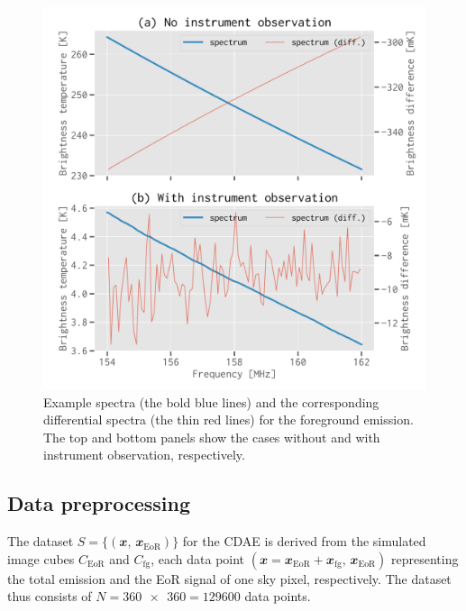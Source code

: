 \documentclass[letters,fleqn,usenatbib]{mnras}
\newlength{\myfigwidth}
\newcommand{\R}[1]{\mathrm{#1}}
\newcommand{\B}[1]{\mathbfit{#1}}
\begin{document}
\begin{figure}
  \centering
  \includegraphics[width=\myfigwidth]{simudata}
  \caption{\label{fig:simudata}%
    Example spectra (the bold blue lines) and the corresponding
    differential spectra (the thin red lines) for the foreground
    emission.
    The top and bottom panels show the cases without and with
    instrument observation, respectively.
  }
\end{figure}


\subsection{Data preprocessing}
\label{sec:preprocessing}

The dataset $S = \{(\B{x}, \,\B{x}_{\R{EoR}})\}$ for the CDAE is derived
from the simulated image cubes $C_{\R{EoR}}$ and $C_{\R{fg}}$, each data
point $(\B{x} = \B{x}_{\R{EoR}} + \B{x}_{\R{fg}}, \,\B{x}_{\R{EoR}})$
representing the total emission and the EoR signal of one sky pixel,
respectively.
The dataset thus consists of $N = \num{360x360} = \num{129600}$ data points.
\end{document}

